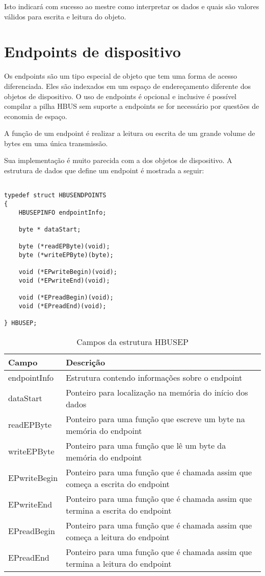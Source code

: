 \documentclass[11pt]{report}
\begin{document}
Isto indicará com sucesso ao mestre como interpretar os dados e quais são valores válidos para escrita e leitura do objeto.

\section{Endpoints de dispositivo}

Os endpoints são um tipo especial de objeto que tem uma forma de acesso diferenciada. Eles são indexados em um espaço de endereçamento diferente dos objetos de dispositivo. O uso de endpoints é opcional e inclusive é possível compilar a pilha HBUS sem suporte a endpoints se for necessário por questões de economia de espaço.

A função de um endpoint é realizar a leitura ou escrita de um grande volume de bytes em uma única transmissão.

Sua implementação é muito parecida com a dos objetos de dispositivo. A estrutura de dados que define um endpoint é mostrada a seguir:

\begin{verbatim}

typedef struct HBUSENDPOINTS
{
	HBUSEPINFO endpointInfo;
	
	byte * dataStart;
	
	byte (*readEPByte)(void);
	byte (*writeEPByte)(byte);
	
	void (*EPwriteBegin)(void);
	void (*EPwriteEnd)(void);
	
	void (*EPreadBegin)(void);
	void (*EPreadEnd)(void);
	
} HBUSEP;

\end{verbatim}

\begin{table}[H]
\centering
\caption{Campos da estrutura HBUSEP}
\begin{tabular}{l p{12cm}}

\hline
Campo					&	Descrição\\
\hline
endpointInfo				&	Estrutura contendo informações sobre o endpoint\\
dataStart				&	Ponteiro para localização na memória do início dos dados\\
readEPByte				&	Ponteiro para uma função que escreve um byte na memória do endpoint\\
writeEPByte				&	Ponteiro para uma função que lê um byte da memória do endpoint\\
EPwriteBegin				&	Ponteiro para uma função que é chamada assim que começa a escrita do endpoint\\
EPwriteEnd				&	Ponteiro para uma função que é chamada assim que termina a escrita do endpoint\\
EPreadBegin				&	Ponteiro para uma função que é chamada assim que começa a leitura do endpoint\\
EPreadEnd				&	Ponteiro para uma função que é chamada assim que termina a leitura do endpoint\\
\hline

\end{tabular}
\end{table}
\end{document}
